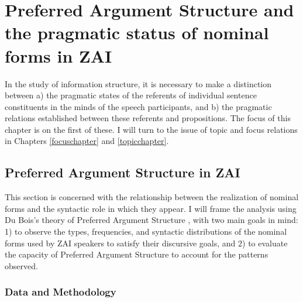 \chapter{Preferred Argument Structure and the pragmatic status of nominal forms in ZAI}\label{paschapter}


In the study of information structure, it is necessary to make a distinction between a) the pragmatic states of the referents of individual sentence constituents in the minds of the speech participants, and b) the pragmatic relations established between these referents and propositions. The focus of this chapter is on the first of these. I will turn to the issue of topic and focus relations in Chapters \ref{focuschapter} and \ref{topicchapter}.



\section{Preferred Argument Structure in ZAI}\label{pasinzai}

This section is concerned with the relationship between the realization of nominal forms and the syntactic role in which they appear. I will frame the analysis using Du Bois's theory of Preferred Argument Structure \citep{dubois1987,dubois2003,dubois2003a,dubois2003b}, with two main goals in mind: 1) to observe the types, frequencies, and syntactic distributions of the nominal forms used by ZAI speakers to satisfy their discursive goals, and 2) to evaluate the capacity of Preferred Argument Structure to account for the patterns observed.


\subsection{Data and Methodology}\label{data}

